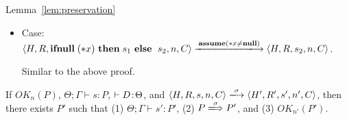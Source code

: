 \begin{pfof}{Lemma~\ref{lem:preservation}}
\begin{itemize}
  By subtying, we get \( \langle P, F \xLongrightarrow Q, F'\) and
  \(P_1 \le Q\) for some \(Q\).

  We need to find \(P'\) s.t. \(\Theta;\Gamma\vdash s_1:P'\), \(
  \langle P, F \xLongrightarrow P', F' \rangle\) and \(OK_n(P',F')\).
  Take \(Q\) as \(P'\) and \( F \cup{\snull}\}\) as \(F'\), therefore
  \( \langle P, F \xLongrightarrow P', F' \rangle\) and
  \(OK_n(P',F')\) hold. From \(\Theta;\Gamma\vdash s_1:P_1\), \(P_1
  \le Q\) and \(\rn{T-Sub}\), \(\Theta;\Gamma\vdash s_1:P'\) holds.

  \subitem assume that \(\scon\Sirx \notin F\)

  By subtying, we get \( \langle P, F \xLongrightarrow Q, F\) and
  \(P_1 \le Q\) for some \(Q\).

  We need to find \(P'\) s.t. \(\Theta;\Gamma\vdash s_1:P'\), \(
  \langle P, F \xLongrightarrow P', F' \rangle\) and \(OK_n(P',F')\).
  Take \(Q\) as \(P'\) and \(F\) as \(F'\), therefore
  \( \langle P, F \xLongrightarrow P', F' \rangle\) and
  \(OK_n(P',F')\) hold. From \(\Theta;\Gamma\vdash s_1:P_1\), \(P_1
  \le Q\) and \(\rn{T-Sub}\), \(\Theta;\Gamma\vdash s_1:P'\) holds.

  \subitem assume that \(\scon\Sirx \notin F\)

  By subtying, we get \( \langle P, F \xLongrightarrow Q, F\) and
  \(P_1 \le Q\) for some \(Q\).

  We need to find \(P'\) s.t. \(\Theta;\Gamma\vdash s_1:P'\), \(
  \langle P, F \xLongrightarrow P', F' \rangle\) and \(OK_n(P',F')\).
  Take \(Q\) as \(P'\) and \(F\) as \(F'\), therefore
  \( \langle P, F \xLongrightarrow P', F' \rangle\) and
  \(OK_n(P',F')\) hold. From \(\Theta;\Gamma\vdash s_1:P_1\), \(P_1
  \le Q\) and \(\rn{T-Sub}\), \(\Theta;\Gamma\vdash s_1:P'\) holds.


\item Case: \(\langle H, R, \IFNULL \Sirx \ \THEN s_{1} \ \ELSE \ s_{2},
  n , C \rangle \xlongrightarrow{\sassxn} \langle H, R, s_{2}, n, C\rangle\).

  Similar to the above proof.
  

\end{itemize}
\end{pfof}  

\begin{corollary}
\label{cor:preservation}
If $OK_{n}(P)$, $\Theta; \Gamma \vdash s : P$, \(\vdash D \!:\!
\Theta\), and $\langle H,R,s,n,C\rangle \xlongrightarrow{\sigma}
\langle H',R',s', n', C \rangle$, then there exists $P'$ such that (1) $
\Theta; \Gamma \vdash s' : P'$, (2) \(P \xLongrightarrow{\sigma} P'\),
and (3) \(OK_{n'}(P')\).
\end{corollary}


